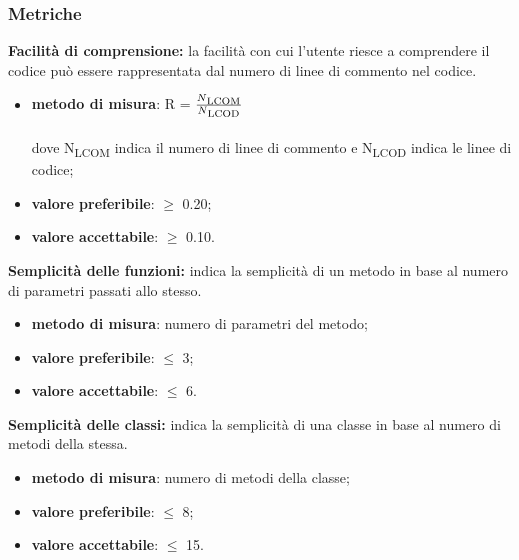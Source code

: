 \subsubsection{Metriche}
\textbf{Facilità di comprensione:} la facilità con cui l'utente riesce a comprendere il codice può essere rappresentata dal numero di linee di 
commento nel codice.
\begin{itemize}
    \item \textbf{metodo di misura}: R = $\frac{N\textsubscript{LCOM}}{N\textsubscript{LCOD}}$ \\
    \\dove N\textsubscript{LCOM} indica il numero di linee di commento e N\textsubscript{LCOD} indica le linee di codice;
    \item \textbf{valore preferibile}: $\geq$ 0.20;
    \item \textbf{valore accettabile}: $\geq$ 0.10.
\end{itemize}
\textbf{Semplicità delle funzioni:} indica la semplicità di un metodo in base al numero di parametri passati allo stesso.
\begin{itemize}
    \item \textbf{metodo di misura}: numero di parametri del metodo;
    \item \textbf{valore preferibile}: $\leq$ 3;
    \item \textbf{valore accettabile}: $\leq$ 6.
\end{itemize}
\textbf{Semplicità delle classi:} indica la semplicità di una classe in base al numero di metodi della stessa.
\begin{itemize}
    \item \textbf{metodo di misura}: numero di metodi della classe;
    \item \textbf{valore preferibile}: $\leq$ 8;
    \item \textbf{valore accettabile}: $\leq$ 15.
\end{itemize}

